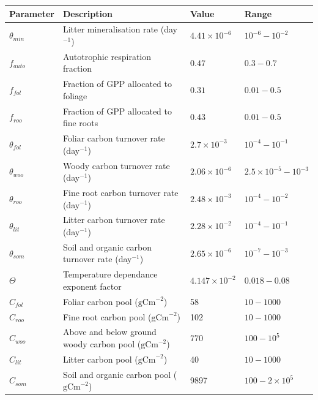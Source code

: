 \begin{center}
\scriptsize
\begin{tabular}{| l | l | l | l |}
\hline
Parameter & Description & Value & Range \\ \hline
$\theta_{min}$ & Litter mineralisation rate (day$^{-1}$) & $4.41\times 10^{-6}$ & $10^{-6} - 10^{-2}$ \\ \hline
$f_{auto}$ & Autotrophic respiration fraction & $0.47$ & $0.3 - 0.7$ \\ \hline
$f_{fol}$ & Fraction of GPP allocated to foliage & $0.31$ & $0.01-0.5$ \\ \hline
$f_{roo}$ & Fraction of GPP allocated to fine roots & $0.43$ & $0.01-0.5$ \\ \hline
$\theta_{fol}$ & Foliar carbon turnover rate (day$^{-1}$) & $2.7\times 10^{-3}$ & $10^{-4} - 10^{-1}$ \\ \hline
$\theta_{woo}$ & Woody carbon turnover rate (day$^{-1}$) & $2.06\times 10^{-6}$ & $2.5\times10^{-5} - 10^{-3}$ \\ \hline
$\theta_{roo}$ & Fine root carbon turnover rate (day$^{-1}$) & $2.48\times 10^{-3}$ & $10^{-4} - 10^{-2}$ \\ \hline
$\theta_{lit}$ & Litter carbon turnover rate (day$^{-1}$) & $2.28\times 10^{-2}$ & $10^{-4} - 10^{-1}$ \\ \hline
$\theta_{som}$ & Soil and organic carbon turnover rate (day$^{-1}$) & $2.65\times 10^{-6}$ & $10^{-7} - 10^{-3}$ \\ \hline
$\Theta$ & Temperature dependance exponent factor & $4.147\times 10^{-2}$ & $0.018 - 0.08$ \\ \hline
$C_{fol}$ & Foliar carbon pool ($\text{gCm}^{-2}$) & 58 & $10 - 1000$  \\ \hline
$C_{roo}$ & Fine root carbon pool ($\text{gCm}^{-2}$) & 102 & $10 - 1000$   \\ \hline
$C_{woo}$ & Above and below ground woody carbon pool ($\text{gCm}^{-2}$) & 770 & $100 - 10^{5}$  \\ \hline
$C_{lit}$ & Litter carbon pool ($\text{gCm}^{-2}$) & 40 & $10 - 1000$   \\ \hline
$C_{som}$ & Soil and organic carbon pool ($\text{gCm}^{-2}$) & 9897 & $100 - 2 \times 10^{5}$  \\ 
\hline
\end{tabular}    
 \label{chap5:table:D1params}
\end{center}

